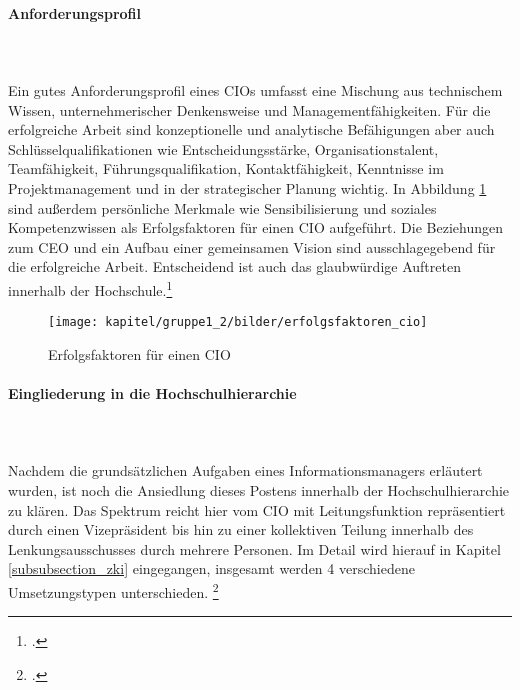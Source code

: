 \paragraph{Anforderungsprofil}\mbox{}\\\\
\label{anforderungsprofil_informationsmanager}
Ein gutes Anforderungsprofil eines CIOs umfasst eine Mischung aus technischem Wissen, unternehmerischer Denkensweise und Managementfähigkeiten. Für die erfolgreiche Arbeit sind konzeptionelle und analytische Befähigungen aber auch Schlüsselqualifikationen wie Entscheidungsstärke, Organisationstalent, Teamfähigkeit, Führungsqualifikation, Kontaktfähigkeit, Kenntnisse im Projektmanagement und  in der strategischer Planung wichtig. In Abbildung \ref{efec} sind außerdem persönliche Merkmale wie Sensibilisierung und soziales Kompetenzwissen als Erfolgsfaktoren für einen CIO aufgeführt. Die Beziehungen zum CEO und ein Aufbau einer gemeinsamen Vision sind ausschlagegebend für die erfolgreiche Arbeit. Entscheidend ist auch das glaubwürdige Auftreten innerhalb der Hochschule.\footcite[Vgl.][150]{krcmar_einfuhrung_2015}

\begin{figure}[h!]
	\centering
	\texttt{[image: kapitel/gruppe1\_2/bilder/erfolgsfaktoren\_cio]} 
	\caption{Erfolgsfaktoren für einen CIO\protect\footnotemark}
	\label{efec}
\end{figure}

\paragraph{Eingliederung in die Hochschulhierarchie}\mbox{}\\\\
Nachdem die grundsätzlichen Aufgaben eines Informationsmanagers erläutert wurden, ist noch die Ansiedlung dieses Postens innerhalb der Hochschulhierarchie zu klären. Das Spektrum reicht hier vom CIO mit Leitungsfunktion repräsentiert durch einen Vizepräsident bis hin zu einer kollektiven Teilung innerhalb des Lenkungsausschusses durch mehrere Personen. Im Detail wird hierauf in Kapitel \ref{subsubsection_zki} eingegangen, insgesamt werden 4 verschiedene Umsetzungstypen unterschieden. \footcite[Vgl.][10]{leitner_itil_2008}


